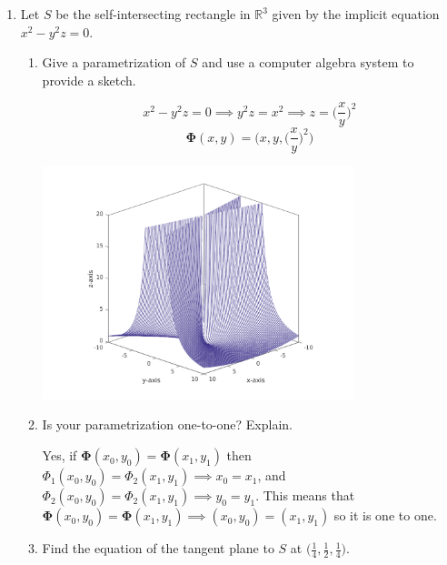\documentclass{article}
\begin{document}
\begin{enumerate}
    \item Let $S$ be the self-intersecting rectangle in $\mathbb{R}^3$ given by the implicit equation $x^2-y^2z=0.$
        \begin{enumerate}
            \item Give a parametrization of $S$ and use a computer algebra system to provide a sketch.

            \[x^2 - y^2z = 0 \implies y^2z = x^2 \implies z = \bigg(\frac{x}{y}\bigg)^2\]
            \[\boldsymbol \Phi (x,y) = \Bigg(x, y, \bigg(\frac{x}{y}\bigg)^2\Bigg)\]

            \includegraphics[width=0.75\textwidth,center]{b42-a8-3a}
            
            \item Is your parametrization one-to-one? Explain.

            Yes, if $\boldsymbol \Phi (x_0,y_0) = \boldsymbol \Phi (x_1,y_1)$ then $\Phi_1(x_0,y_0) = \Phi_2(x_1,y_1) \implies x_0 = x_1$, and $\Phi_2(x_0,y_0) = \Phi_2(x_1,y_1) \implies y_0 = y_1$. This means that $\boldsymbol \Phi (x_0, y_0) = \boldsymbol \Phi (x_1, y_1) \implies (x_0, y_0) = (x_1, y_1)$ so it is one to one.
            
            \item Find the equation of the tangent plane to $S$ at $\displaystyle \bigg( \frac{1}{4}, \frac{1}{2}, \frac{1}{4} \bigg).$


\end{enumerate}
\end{enumerate}
\end{document}
